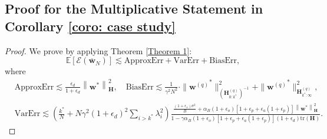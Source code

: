 \documentclass[11pt, letterpaper]{article}
\begin{document}
\subsection{Proof for the Multiplicative Statement in Corollary \ref{coro: case study}}
\begin{proof}
    We prove by applying Theorem \ref{Theorem 1}:
    \begin{equation*}
        \mathbb{E}[\mathcal{E}(\overline{\mathbf{w}}_N)] \lesssim \mathrm{ApproxErr}+\mathrm{VarErr}+\mathrm{BiasErr},
    \end{equation*}
    where
    \begin{equation*}
        \begin{aligned}
            &\mathrm{ApproxErr}\lesssim \frac{\epsilon_d}{1+\epsilon_d}\left\|\mathbf{w}^*\right\|_\mathbf{H}^2,\quad \mathrm{BiasErr}\lesssim\frac{1}{\gamma^2N^2}\cdot\|{\mathbf{w}^{(q)}}^*\|_{(\mathbf{H}_{0:k^*}^{(q)})^{-1}}^2+\|{\mathbf{w}^{(q)}}^*\|_{\mathbf{H}_{k^*:\infty}^{(q)}}^2,\\
            &\mathrm{VarErr}\lesssim\left(\frac{k^*}{N}+N\gamma^2(1+\epsilon_d)^2\sum_{i>k^*}\lambda_i^2\right) \frac{\frac{(1+\epsilon_o)\sigma^2}{B}+\alpha_B(1+\epsilon_o) [1+\epsilon_p+\epsilon_a(1+\epsilon_p)]\left\|\mathbf{w}^*\right\|_\mathbf{H}^2}{1-\gamma\alpha_B(1+\epsilon_o)[1+\epsilon_p+\epsilon_a(1+\epsilon_p)](1+\epsilon_d)\mathrm{tr}\left(\mathbf{H}\right)}.
        \end{aligned}
    \end{equation*}


\end{proof}
\end{document}
